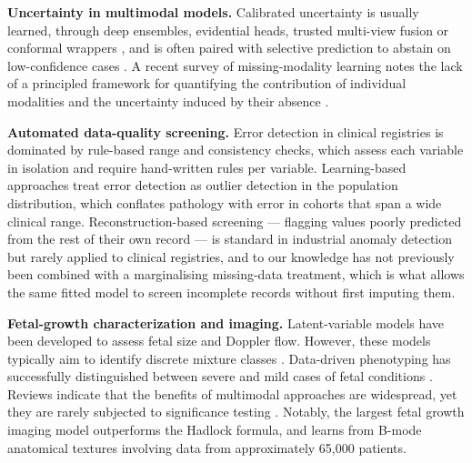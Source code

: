 \documentclass[a4paper,fleqn]{cas-sc}
\begin{document}
\noindent\textbf{Uncertainty in multimodal models.} Calibrated uncertainty is usually learned, through deep ensembles, evidential heads, trusted multi-view fusion or conformal wrappers \cite{ref:sensoy,ref:han,ref:conformal}, and is often paired with selective prediction to abstain on low-confidence cases \cite{ref:selective}. A recent survey of missing-modality learning notes the lack of a principled framework for quantifying the contribution of individual modalities and the uncertainty induced by their absence \cite{ref:wu}.

\noindent\textbf{Automated data-quality screening.} Error detection in clinical registries is dominated by rule-based range and consistency checks, which assess each variable in isolation and require hand-written rules per variable. Learning-based approaches treat error detection as outlier detection in the population distribution, which conflates pathology with error in cohorts that span a wide clinical range. Reconstruction-based screening --- flagging values poorly predicted from the rest of their own record --- is standard in industrial anomaly detection but rarely applied to clinical registries, and to our knowledge has not previously been combined with a marginalising missing-data treatment, which is what allows the same fitted model to screen incomplete records without first imputing them.

\noindent\textbf{Fetal-growth characterization and imaging.} Latent-variable models have been developed to assess fetal size and Doppler flow. However, these models typically aim to identify discrete mixture classes \cite{ref:slaughter}. Data-driven phenotyping has successfully distinguished between severe and mild cases of fetal conditions \cite{ref:miranda}. Reviews indicate that the benefits of multimodal approaches are widespread, yet they are rarely subjected to significance testing \cite{ref:schouten}. Notably, the largest fetal growth imaging model \cite{ref:truong} outperforms the Hadlock formula, and learns from B-mode anatomical textures involving data from approximately 65,000 patients.
\end{document}
